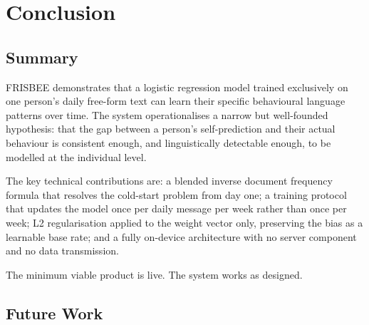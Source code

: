 \documentclass[11pt, a4paper]{report}
\begin{document}
\clearpage
\chapter{Conclusion}

\section{Summary}

FRISBEE demonstrates that a logistic regression model trained exclusively
on one person's daily free-form text can learn their specific behavioural
language patterns over time. The system operationalises a narrow but
well-founded hypothesis: that the gap between a person's self-prediction
and their actual behaviour is consistent enough, and linguistically
detectable enough, to be modelled at the individual level.

The key technical contributions are: a blended inverse document frequency
formula that resolves the cold-start problem from day one; a training
protocol that updates the model once per daily message per week rather
than once per week; L2 regularisation applied to the weight vector only,
preserving the bias as a learnable base rate; and a fully on-device
architecture with no server component and no data transmission.

The minimum viable product is live. The system works as designed.

\section{Future Work}
\end{document}
